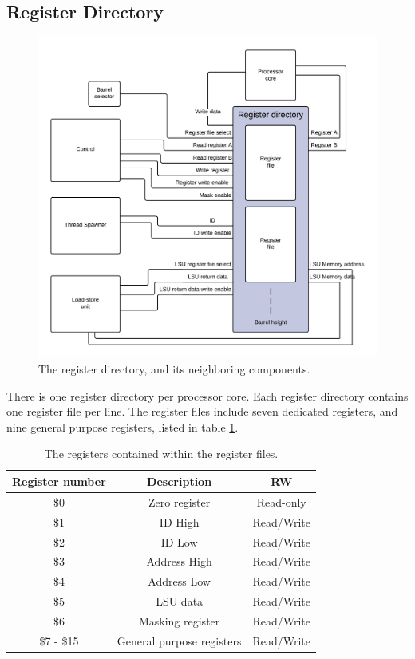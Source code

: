 \subsection{Register Directory}
\begin{figure}[H]
	\centering
	\includegraphics[width=\textwidth]{../gpu/diagrams/register_directory.png}
	\caption{The register directory, and its neighboring components.}
	\label{fig:register_directory}
\end{figure}

There is one register directory per processor core.
Each register directory contains one register file per line.
The register files include seven dedicated registers, and nine general purpose registers, listed in table \ref{tab:registers_overview}.

\begin{table}[H]
	\centering
	\begin{tabular}{|c|c|c|}
		\hline Register number & Description & RW \\ 
		\hline \$0 & Zero register & Read-only \\ 
		\hline \$1 & ID High & Read/Write \\ 
		\hline \$2 & ID Low & Read/Write \\ 
		\hline \$3 & Address High & Read/Write \\ 
		\hline \$4 & Address Low & Read/Write \\ 
		\hline \$5 & LSU data & Read/Write \\ 
		\hline \$6 & Masking register & Read/Write \\ 
		\hline \$7 - \$15 & General purpose registers & Read/Write \\ 
		\hline 
	\end{tabular} 
	\caption{The registers contained within the register files.}
	\label{tab:registers_overview}
\end{table}

